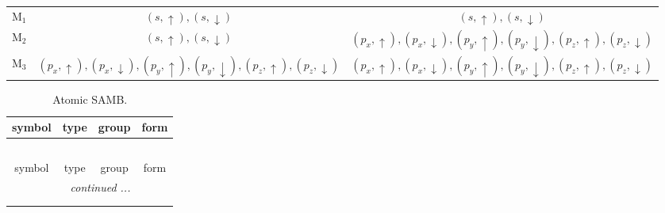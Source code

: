 \documentclass[fleqn,10pt,landscape]{article}
\begin{document}
\begin{itemize}
\begin{center}
\begin{longtable}{c|c|c}
M$_{1}$ & $(s,\uparrow), (s,\downarrow)$ & $(s,\uparrow), (s,\downarrow)$ \\
M$_{2}$ & $(s,\uparrow), (s,\downarrow)$ & $(p_{x},\uparrow), (p_{x},\downarrow), (p_{y},\uparrow), (p_{y},\downarrow), (p_{z},\uparrow), (p_{z},\downarrow)$ \\
M$_{3}$ & $(p_{x},\uparrow), (p_{x},\downarrow), (p_{y},\uparrow), (p_{y},\downarrow), (p_{z},\uparrow), (p_{z},\downarrow)$ & $(p_{x},\uparrow), (p_{x},\downarrow), (p_{y},\uparrow), (p_{y},\downarrow), (p_{z},\uparrow), (p_{z},\downarrow)$ \\
\end{longtable}
\end{center}
\begin{center}
\renewcommand{\arraystretch}{1.3}
\begin{longtable}{c|c|c|c}
\caption{Atomic SAMB.}
 \\
 \hline \hline
symbol & type & group & form \\ \hline \endfirsthead

\multicolumn{3}{l}{\tablename\ \thetable{}} \\
 \hline \hline
symbol & type & group & form \\ \hline \endhead

 \hline \hline
\multicolumn{3}{r}{\footnotesize\it continued ...} \\ \endfoot

 \hline \hline
\multicolumn{3}{r}{} \\ \endlastfoot


\end{longtable}
\end{center}
\end{itemize}
\end{document}
